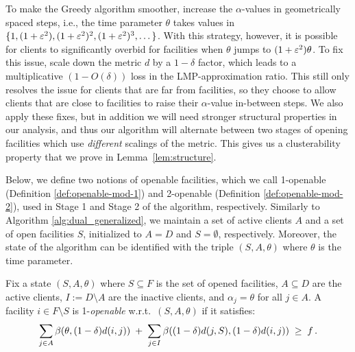 To make the Greedy algorithm smoother, \cite{MR4928455-Cohen25} increase the $\alpha$-values in geometrically spaced steps, i.e., the time parameter $\theta$ takes values in $\{1,(1+\varepsilon^2),(1+\varepsilon^2)^2,(1+\varepsilon^2)^3, \dots\}$.
With this strategy, however, it is possible for clients to significantly overbid for facilities when $\theta$ jumps to $(1+\varepsilon^2)\theta$.
To fix this issue, \cite{MR4928455-Cohen25} scale down the metric $d$ by a $1-\delta$ factor, which leads to a multiplicative $(1-O(\delta))$ loss in the LMP-approximation ratio.
This still only resolves the issue for clients that are far from facilities, so they choose to allow clients that are close to facilities to raise their $\alpha$-value in-between steps.
We also apply these fixes, but in addition we will need stronger structural properties in our analysis, and thus our algorithm will alternate between two stages of opening facilities which use \emph{different} scalings of the metric.
This gives us a clusterability property that we prove in Lemma~\ref{lem:structure}.

Below, we define two notions of openable facilities, which we call 1-openable (Definition \ref{def:openable-mod-1}) and 2-openable (Definition \ref{def:openable-mod-2}), used in Stage 1 and Stage 2 of the algorithm, respectively.
Similarly to Algorithm \ref{alg:dual_generalized}, we maintain a set of active clients $A$ and a set of open facilities $S$, initialized to $A=D$ and $S = \emptyset$, respectively.
Moreover, the state of the algorithm can be identified with the triple $(S,A,\theta)$ where $\theta$ is the time parameter.
\begin{definition}
\label{def:openable-mod-1}
Fix a state $(S,A,\theta)$ where $S\subseteq F$ is the set of opened facilities, $A\subseteq D$ are the active clients, $I:=D\setminus A$ are the inactive clients, and
    $\alpha_j=\theta$ for all $j\in A$.
A facility $i\in F\setminus S$ is 1-\emph{openable} w.r.t.\ $(S,A,\theta)$ if it 
satisfies:
\[
\sum_{j\in A}\beta(\theta, (1-\delta)d(i,j))
\;+\;
\sum_{j\in I}\beta((1-\delta)d(j,S), (1-\delta)d(i,j))
\;\ge\; f\,.
\]
\end{definition}


